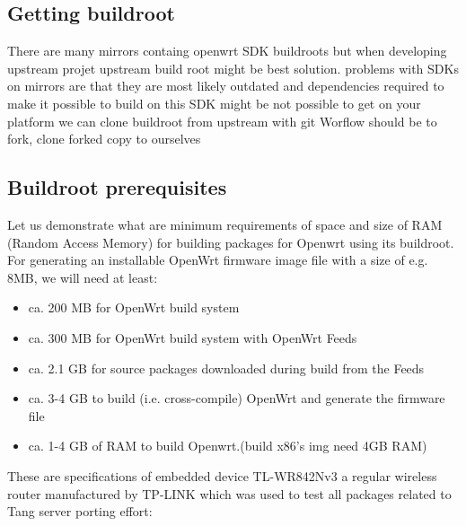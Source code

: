 \subsection{Getting buildroot}

There are many mirrors containg openwrt SDK buildroots but when developing upstream projet upstream build root might be best solution.
problems with SDKs on mirrors are that they are most likely outdated and dependencies required to make it possible to build on this SDK might be not possible to get on your platform
we can clone buildroot from upstream with git Worflow should be to fork, clone forked copy to ourselves

\subsection{Buildroot prerequisites}

Let us demonstrate what are minimum requirements of space and size of RAM (Random Access Memory) for building packages for Openwrt using its buildroot.
For generating an installable OpenWrt firmware image file with a size of e.g. 8MB, we will need at least:

\begin{itemize}
\item ca. 200 MB for OpenWrt build system
\item ca. 300 MB for OpenWrt build system with OpenWrt Feeds
\item ca. 2.1 GB for source packages downloaded during build from the Feeds
\item ca. 3-4 GB to build (i.e. cross-compile) OpenWrt and generate the firmware file
\item ca. 1-4 GB of RAM to build Openwrt.(build x86's img need 4GB RAM)
\end{itemize}

These are specifications of embedded device TL-WR842Nv3 a regular wireless router manufactured by TP-LINK which was used to test all packages related to Tang server porting effort:

